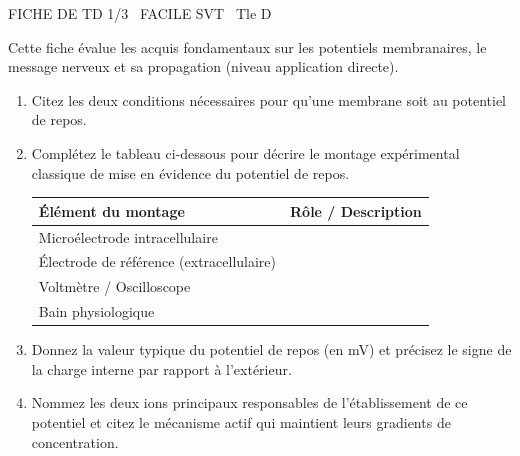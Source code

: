 \documentclass[11pt]{article}
\begin{document}
\begin{tcolorbox}[enhanced,colback=popink,colframe=popink,arc=10pt,boxrule=0pt,left=12pt,right=12pt,top=9pt,bottom=9pt]
{\color{white}\popxbold\small FICHE DE TD 1/3 \textbullet\ FACILE \hfill SVT \textbullet\ Tle D\par}
\end{tcolorbox}
\vspace{4pt}
Cette fiche évalue les acquis fondamentaux sur les potentiels membranaires, le message nerveux et sa propagation (niveau application directe).

\begin{exercice}
\begin{enumerate}
    \item Citez les deux conditions nécessaires pour qu'une membrane soit au potentiel de repos.
    \item Complétez le tableau ci-dessous pour décrire le montage expérimental classique de mise en évidence du potentiel de repos.
    \begin{tabularx}{\linewidth}{>{\raggedright\arraybackslash}X>{\raggedright\arraybackslash}X}
        \toprule
        \textbf{Élément du montage} & \textbf{Rôle / Description} \\
        \midrule
        Microélectrode intracellulaire & \\
        Électrode de référence (extracellulaire) & \\
        Voltmètre / Oscilloscope & \\
        Bain physiologique & \\
        \bottomrule
    \end{tabularx}
    \item Donnez la valeur typique du potentiel de repos (en mV) et précisez le signe de la charge interne par rapport à l'extérieur.
    \item Nommez les deux ions principaux responsables de l'établissement de ce potentiel et citez le mécanisme actif qui maintient leurs gradients de concentration.
\end{enumerate}
\end{exercice}
\end{document}
